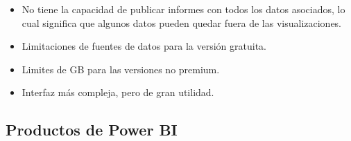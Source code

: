 \documentclass[
]{book}
\begin{document}
\begin{itemize}
\item
  No tiene la capacidad de publicar informes con todos los datos asociados, lo cual significa que algunos datos pueden quedar fuera de las visualizaciones.
\item
  Limitaciones de fuentes de datos para la versión gratuita.
\item
  Limites de GB para las versiones no premium.
\item
  Interfaz más compleja, pero de gran utilidad.
\end{itemize}

\hypertarget{productos-de-power-bi}{%
\subsection{Productos de Power BI}\label{productos-de-power-bi}}
\end{document}
